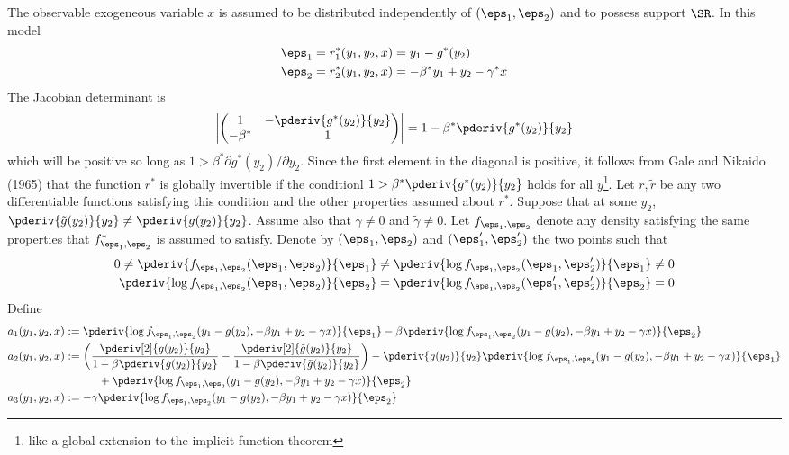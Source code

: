 The observable exogeneous variable $x$ is assumed to be distributed independently of $(\eps_1, \eps_2)$ and to possess support $\SR$. In this model 
\begin{align*}
  \eps_1 &= r^*_1(y_1, y_2, x) = y_1 - g^*(y_2) \\
  \eps_2 &= r^*_2(y_1, y_2, x) = -\beta^*y_1 + y_2 - \gamma^*x
\end{align*}
The Jacobian determinant is 
\[
\left|\begin{pmatrix}
1 & -\pderiv{g^*(y_2)}{y_2} \\ 
-\beta^* & 1
\end{pmatrix}\right| = 1 - \beta^* \pderiv{g^*(y_2)}{y_2}
\]
which will be positive so long as $1 > \beta^* \partial g^*(y_2)/\partial y_2$. Since the first element in the diagonal is positive, it follows from Gale and Nikaido (1965) that the function $r^*$ is globally invertible if the conditionl $1 > \beta^* \pderiv{g^*(y_2)}{y_2}$ holds for all $y$\footnote{like a global extension to the implicit function theorem}. Let $r,\tilde{r}$ be any two differentiable functions satisfying this condition and the other properties assumed about $r^*$. Suppose that at some $y_2$, $\pderiv{\tilde{g}(y_2)}{y_2} \neq \pderiv{g(y_2)}{y_2}$. Assume also that $\gamma \neq 0$ and $\tilde{\gamma} \neq 0$. Let $f_{\eps_1,\eps_2}$ denote any density satisfying the same properties that $f^*_{\eps_1,\eps_2}$ is assumed to satisfy. Denote by $(\eps_1,\eps_2)$ and $(\eps_1',\eps_2')$ the two points such that 
\begin{align*}
  0 \neq \pderiv{f_{\eps_1,\eps_2}(\eps_1,\eps_2)}{\eps_1} &\neq \pderiv{\log f_{\eps_1,\eps_2}(\eps_1,\eps_2')}{\eps_1} \neq 0 \\
  \pderiv{\log f_{\eps_1,\eps_2}(\eps_1,\eps_2)}{\eps_2} &= \pderiv{\log f_{\eps_1,\eps_2}(\eps_1', \eps_2')}{\eps_2} = 0
\end{align*}
Define 
\begin{align*}
    a_1(y_1,y_2,x) &:= \pderiv{\log f_{\eps_1,\eps_2}(y_1 - g(y_2), -\beta y_1 + y_2 -\gamma x)}{\eps_1} - \beta\pderiv{\log f_{\eps_1,\eps_2}(y_1 - g(y_2), -\beta y_1 + y_2 - \gamma x)}{\eps_2} \\
    a_2(y_1, y_2,x) &:= \left(\frac{\pderiv[2]{g(y_2)}{y_2}}{1 - \beta\pderiv{g(y_2)}{y_2}} -  \frac{\pderiv[2]{\tilde{g}(y_2)}{y_2}}{1 - \beta\pderiv{\tilde{g}(y_2)}{y_2}}\right) - \pderiv{g(y_2)}{y_2}\pderiv{\log f_{\eps_1,\eps_2}(y_1 - g(y_2), -\beta y_1 + y_2 -\gamma x)}{\eps_1} \\
    &\hbox{ }\text{ }\hbox{ }\hbox{ }\text{ }\hbox{ }\hbox{ }\text{ }\hbox{ }+ \pderiv{\log f_{\eps_1,\eps_2}(y_1 - g(y_2), -\beta y_1 + y_2 -\gamma x)}{\eps_2} \\
    a_3(y_1, y_2, x) &:= -\gamma \pderiv{\log f_{\eps_1,\eps_2}(y_1 - g(y_2), -\beta y_1 + y_2 -\gamma x)}{\eps_2}
\end{align*}
